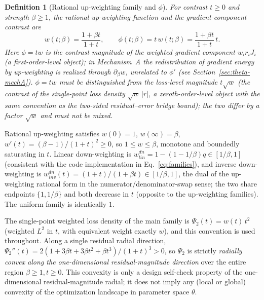 \documentclass[11pt]{article}
\newtheorem{definition}{Definition}[section]
\numberwithin{equation}{section}
\begin{document}
\begin{definition}[Rational up-weighting family and $\phi$]\label{def:w}
For contrast $t\ge0$ and strength $\beta\ge1$, the rational up-weighting function and the \emph{gradient-component contrast} are
\begin{equation}\label{eq:rational}
w(t;\beta)=\frac{1+\beta t}{1+t},\qquad \phi(t;\beta)=t\,w(t;\beta)=\frac{1+\beta t}{1+t}\,t .
\end{equation}
Here $\phi=tw$ is the contrast magnitude of the weighted gradient component $w_i r_i J_i$ (a first-order-level object); in Mechanism~A the redistribution of gradient energy by up-weighting is realized through $\partial_\beta w$, unrelated to $\phi'$ (see Section~\ref{sec:theta-mechA}). $\phi=tw$ must be distinguished from the \emph{loss-level magnitude} $t\sqrt w$ (the contrast of the single-point loss density $\sqrt w\,|r|$, a zeroth-order-level object with the same convention as the two-sided residual--error bridge bound); the two differ by a factor $\sqrt w$ and must not be mixed.
\end{definition}

Rational up-weighting satisfies $w(0)=1$, $w(\infty)=\beta$, $w'(t)=(\beta-1)/(1+t)^2\ge0$, so $1\le w\le\beta$, monotone and boundedly saturating in $t$. Linear down-weighting is $w^{dn}_{lin}=1-(1-1/\beta)q\in[1/\beta,1]$ (consistent with the code implementation in Eq.~\eqref{eq:families}), and inverse down-weighting is $w^{dn}_{inv}(t)=(1+t)/(1+\beta t)\in[1/\beta,1]$, the dual of the up-weighting rational form in the numerator/denominator-swap sense; the two share endpoints $\{1,1/\beta\}$ and both decrease in $t$ (opposite to the up-weighting families). The uniform family is identically $1$.

The single-point weighted loss density of the main family is $\Psi_2(t)=w(t)\,t^2$ (weighted $L^2$ in $t$, with equivalent weight exactly $w$), and this convention is used throughout. Along a single residual radial direction, $\Psi_2''(t)=2(1+3\beta t+3\beta t^2+\beta t^3)/(1+t)^3>0$, so $\Psi_2$ is strictly \emph{radially convex along the one-dimensional residual-magnitude direction} over the entire region $\beta\ge1,t\ge0$. This convexity is only a design self-check property of the one-dimensional residual-magnitude radial; it does not imply any (local or global) convexity of the optimization landscape in parameter space $\theta$.
\end{document}
